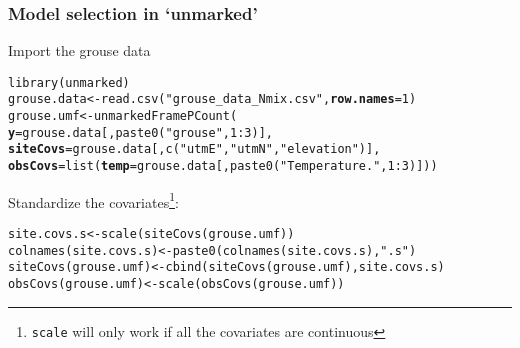 \documentclass[color=usenames,dvipsnames]{beamer}\usepackage[]{graphicx}\usepackage[]{color}
\makeatletter
\newcommand{\hlnum}[1]{\textcolor[rgb]{0.69,0.494,0}{#1}}%
\newcommand{\hlstr}[1]{\textcolor[rgb]{0.749,0.012,0.012}{#1}}%
\newcommand{\hlopt}[1]{\textcolor[rgb]{0,0,0}{#1}}%
\newcommand{\hlstd}[1]{\textcolor[rgb]{0,0,0}{#1}}%
\newcommand{\hlkwb}[1]{\textcolor[rgb]{0,0.341,0.682}{#1}}%
\newcommand{\hlkwc}[1]{\textcolor[rgb]{0,0,0}{\textbf{#1}}}%
\newcommand{\hlkwd}[1]{\textcolor[rgb]{0.004,0.004,0.506}{#1}}%
\newenvironment{kframe}{%
 \def\at@end@of@kframe{}%
 \ifinner\ifhmode%
  \def\at@end@of@kframe{\end{minipage}}%
  \begin{minipage}{\columnwidth}%
 \fi\fi%
 \def\FrameCommand##1{\hskip\@totalleftmargin \hskip-\fboxsep
 \colorbox{shadecolor}{##1}\hskip-\fboxsep
     \hskip-\linewidth \hskip-\@totalleftmargin \hskip\columnwidth}%
 \MakeFramed {\advance\hsize-\width
   \@totalleftmargin\z@ \linewidth\hsize
   \@setminipage}}%
 {\par\unskip\endMakeFramed%
 \at@end@of@kframe}
\newenvironment{knitrout}{}{} %
\newcommand{\inr}[1]{\colorbox{inlinecolor}{\texttt{#1}}}
\makeatother
\begin{document}
\bgroup
\let\oldfootnoterule\footnoterule
\def\footnoterule{\only<2->\oldfootnoterule}
\begin{frame}[fragile]
  \frametitle{Model selection in `unmarked'}
  \small
  Import the grouse data
  \vspace{-6pt}
\begin{knitrout}\footnotesize
{}\color{fgcolor}\begin{kframe}
\begin{alltt}
\hlkwd{library}\hlstd{(unmarked)}
\hlstd{grouse.data} \hlkwb{<-} \hlkwd{read.csv}\hlstd{(}\hlstr{"grouse_data_Nmix.csv"}\hlstd{,} \hlkwc{row.names}\hlstd{=}\hlnum{1}\hlstd{)}
\hlstd{grouse.umf} \hlkwb{<-} \hlkwd{unmarkedFramePCount}\hlstd{(}
    \hlkwc{y}\hlstd{=grouse.data[,}\hlkwd{paste0}\hlstd{(}\hlstr{"grouse"}\hlstd{,}\hlnum{1}\hlopt{:}\hlnum{3}\hlstd{)],}
    \hlkwc{siteCovs}\hlstd{=grouse.data[,}\hlkwd{c}\hlstd{(}\hlstr{"utmE"}\hlstd{,}\hlstr{"utmN"}\hlstd{,}\hlstr{"elevation"}\hlstd{)],}
    \hlkwc{obsCovs}\hlstd{=}\hlkwd{list}\hlstd{(}\hlkwc{temp}\hlstd{=grouse.data[,}\hlkwd{paste0}\hlstd{(}\hlstr{"Temperature."}\hlstd{,}\hlnum{1}\hlopt{:}\hlnum{3}\hlstd{)]))}
\end{alltt}
\end{kframe}
\end{knitrout}
\pause
\vfill
Standardize the covariates\footnote<2->{\inr{scale} will only work if all the covariates are continuous}:
  \vspace{-6pt}
\begin{knitrout}\footnotesize
{}\color{fgcolor}\begin{kframe}
\begin{alltt}
\hlstd{site.covs.s} \hlkwb{<-} \hlkwd{scale}\hlstd{(}\hlkwd{siteCovs}\hlstd{(grouse.umf))}
\hlkwd{colnames}\hlstd{(site.covs.s)} \hlkwb{<-} \hlkwd{paste0}\hlstd{(}\hlkwd{colnames}\hlstd{(site.covs.s),} \hlstr{".s"}\hlstd{)}
\hlkwd{siteCovs}\hlstd{(grouse.umf)} \hlkwb{<-} \hlkwd{cbind}\hlstd{(}\hlkwd{siteCovs}\hlstd{(grouse.umf), site.covs.s)}
\hlkwd{obsCovs}\hlstd{(grouse.umf)} \hlkwb{<-} \hlkwd{scale}\hlstd{(}\hlkwd{obsCovs}\hlstd{(grouse.umf))}
\end{alltt}
\end{kframe}
\end{knitrout}
\end{frame}
\egroup
\end{document}
